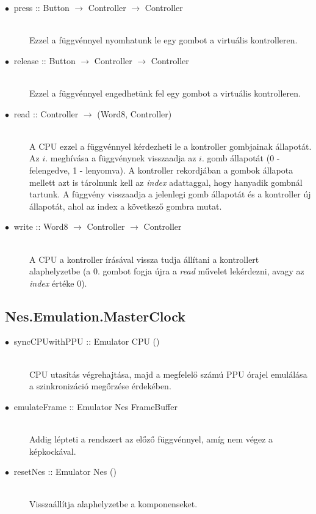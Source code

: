 \begin{description}
	\item[$\bullet\:$ press :: Button $\rightarrow$ Controller $\rightarrow$ Controller] \hfill \\
	Ezzel a függvénnyel nyomhatunk le egy gombot a virtuális kontrolleren.
	\item[$\bullet\:$ release :: Button $\rightarrow$ Controller $\rightarrow$ Controller] \hfill \\
	Ezzel a függvénnyel engedhetünk fel egy gombot a virtuális kontrolleren.
	\item[$\bullet\:$ read :: Controller $\rightarrow$ (Word8, Controller)] \hfill \\
		A CPU ezzel a függvénnyel kérdezheti le a kontroller gombjainak állapotát.
		Az $i.$ meghívása a függvénynek visszaadja az $i.$ gomb állapotát (0 - felengedve, 1 - lenyomva). A kontroller rekordjában a gombok állapota mellett azt is tárolnunk kell az \emph{index} adattaggal, hogy hanyadik gombnál tartunk. A függvény visszaadja a jelenlegi gomb állapotát és a kontroller új állapotát, ahol az index a következő gombra mutat. 
	\item[$\bullet\:$ write :: Word8 $\rightarrow$ Controller $\rightarrow$ Controller] \hfill \\
		A CPU a kontroller írásával vissza tudja állítani a kontrollert alaphelyzetbe (a 0. gombot fogja újra a \emph{read} művelet lekérdezni, avagy az \emph{index} értéke 0).
	
\end{description}

\subsection{Nes.Emulation.MasterClock}

\begin{description}
	\item[$\bullet\:$ syncCPUwithPPU :: Emulator CPU ()] \hfill \\
	CPU utasítás végrehajtása, majd a megfelelő számú PPU órajel emulálása a szinkronizáció megőrzése érdekében.
	\item[$\bullet\:$ emulateFrame :: Emulator Nes FrameBuffer] \hfill \\
	Addig lépteti a rendszert az előző függvénnyel, amíg nem végez a képkockával.
	\item[$\bullet\:$ resetNes :: Emulator Nes ()] \hfill \\
	Visszaállítja alaphelyzetbe a komponenseket. 
\end{description}

